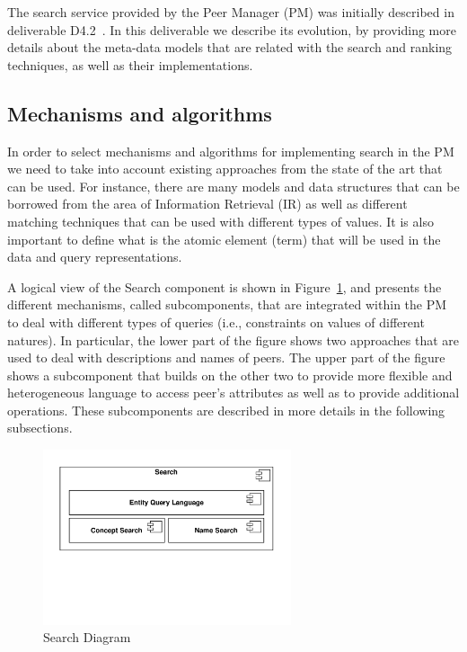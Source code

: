 
The search service provided by the Peer Manager (PM) was initially described in deliverable D4.2~\cite{D4.2}. In this deliverable we describe its evolution, by providing more details about the meta-data models that are related with the search and ranking techniques, as well as their implementations.

\subsection{Mechanisms and algorithms}

In order to select mechanisms and algorithms for implementing search in the PM we need to take into account existing approaches from the state of the art that can be used. For instance, there are many models and data structures that can be borrowed from the area of Information Retrieval (IR) as well as different matching techniques that can be used with different types of values. It is also important to define what is the atomic element (term) that will be used in the data and query representations.

A logical view of the Search component is shown in Figure~\ref{fig:search_diagram}, and presents the different mechanisms, called subcomponents, that are integrated within the PM to deal with different types of queries (i.e., constraints on values of different natures). In particular, the lower part of the figure shows two approaches that are used to deal with descriptions and names of peers. The upper part of the figure shows a subcomponent that builds on the other two to provide more flexible and heterogeneous language to access peer’s attributes as well as to provide additional operations. These subcomponents are described in more details in the following subsections.

\begin{figure}[htbp]
\centering
\includegraphics[width=0.65\textwidth]{figures/SearchComponentDiagram}
\caption{Search Diagram}
\label{fig:search_diagram}
\end{figure}


